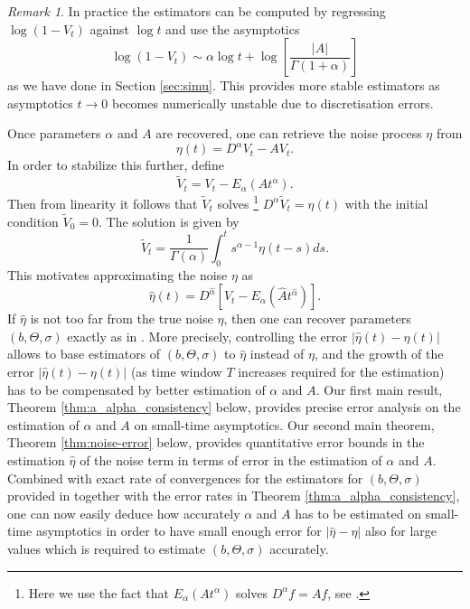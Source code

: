 \documentclass[11pt,reqno,oneside, a4paper]{amsart}
\numberwithin{equation}{section}
\theoremstyle{remark}
\newtheorem{remark}[thm]{Remark}
\begin{document}
\begin{remark}
\label{rmk:regression}
In practice the estimators can be computed by regressing $\log(1-V_t)$ against $\log t$ and use the asymptotics 
$$
\log(1-V_t) \sim \alpha \log t + \log\left[\frac{|A|}{\Gamma(1+\alpha)}\right]
$$
as we have done in Section \ref{sec:simu}. This provides more stable estimators as asymptotics $t\to 0$ becomes numerically unstable due to discretisation errors.
\end{remark}
Once parameters $\alpha$ and $A$ are recovered, one can retrieve the noise process $\eta$ from 
$$
\eta(t) =D^\alpha V_t - AV_t.
$$
In order to stabilize this further, define 
\begin{equation}
    \tilde{V}_t = V_t - E_{\alpha}(At^\alpha).
\end{equation}
Then from linearity it follows that $\tilde{V}_t$ solves \footnote{Here we use the fact that $E_\alpha(At^\alpha)$ solves $D^\alpha f = Af$, see  \cite{Samko1993}. }
$
D^\alpha \tilde{V}_t = \eta(t)
$
with the initial condition $\tilde{V}_0 = 0$. The solution is given by 
$$
\tilde{V}_t = \frac{1}{\Gamma(\alpha)}\int_0^t s^{\alpha-1}\eta(t-s)ds.
$$
This motivates approximating the noise $\eta$ as 
\begin{equation}
\label{eq:eta-proxy}
    \hat\eta(t) = D^{\hat\alpha}\left[V_t - E_{\hat\alpha}(\hat{A}t^{\hat\alpha})\right].
\end{equation}
If $\hat\eta$ is not too far from the true noise $\eta$, then one can recover parameters $(b,\Theta,\sigma)$ exactly as in \cite{Vasicek2025}. More precisely, controlling the error $|\hat\eta(t) - \eta(t)|$ allows to base estimators of $(b,\Theta,\sigma)$ to $\hat\eta$ instead of $\eta$, and the growth of the error $|\hat\eta(t) - \eta(t)|$ (as time window $T$ increases required for the estimation) has to be compensated by better estimation of $\alpha$ and $A$. Our first main result, Theorem \ref{thm:a_alpha_consistency} below, provides precise error analysis on the estimation of $\alpha$ and $A$ on small-time asymptotics. Our second main theorem, Theorem \ref{thm:noise-error} below, provides quantitative error bounds in the estimation $\hat\eta$ of the noise term in terms of error in the estimation of $\alpha$ and $A$. Combined with exact rate of convergences for the estimators for $(b,\Theta,\sigma)$ provided in \cite{Vasicek2025} together with the error rates in Theorem \ref{thm:a_alpha_consistency}, one can now easily deduce how accurately $\alpha$ and $A$ has to be estimated on small-time asymptotics in order to have small enough error for $|\hat\eta-\eta|$ also for large values which is required to estimate $(b,\Theta,\sigma)$ accurately.
\end{document}
